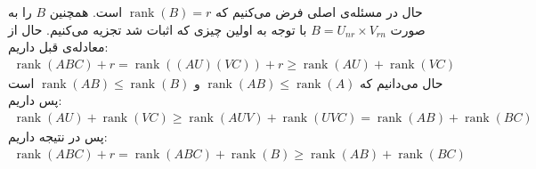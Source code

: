 حال در مسئله‌ی اصلی فرض می‌کنیم که
$\operatorname{rank}(B) = r$
است. همچنین
$B$
را به صورت
$B = U_{nr} \times V_{rn}$
با توجه به اولین چیزی که اثبات شد تجزیه می‌کنیم.
حال از معادله‌ی قبل داریم:
\begin{gather*}
    \operatorname{rank}(ABC) + r = \operatorname{rank}((AU)(VC)) + r \geq \operatorname{rank}(AU) + \operatorname{rank}(VC)
\end{gather*}
حال می‌دانیم که
$\operatorname{rank}(AB) \leq \operatorname{rank}(A)$
و
$\operatorname{rank}(AB) \leq \operatorname{rank}(B)$
است پس داریم:
\begin{gather*}
    \operatorname{rank}(AU) + \operatorname{rank}(VC) \geq \operatorname{rank}(AUV) + \operatorname{rank}(UVC) 
    = \operatorname{rank}(AB) + \operatorname{rank}(BC)
\end{gather*}
پس در نتیجه داریم:
\begin{gather*}
    \operatorname{rank}(ABC) + r = \operatorname{rank}(ABC) + \operatorname{rank}(B) \geq \operatorname{rank}(AB) + \operatorname{rank}(BC)
\end{gather*}